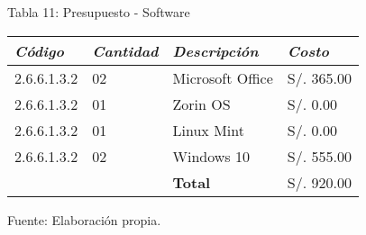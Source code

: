             \begin{table}[h!]
                \centering
                { Tabla 11: Presupuesto - Software}\par
                \begin{tabular}{|p{2.2cm}|p{1.8cm}|p{3.8cm}|p{2.2cm}|} \hline
                    
                
                \textit{{\bf{Código}}} &
                \textit{{\bf{Cantidad}}} &
                \textit{{\bf{Descripción}}} &
                \textit{{\bf{Costo}}}
                \\ \hline

                2.6.6.1.3.2 &
                02 &
                Microsoft Office &
                S/. 365.00
                \\ \hline

                2.6.6.1.3.2 &
                01 &
                Zorin OS &
                S/. 0.00
                \\ \hline

                2.6.6.1.3.2 &
                01 &
                Linux Mint &
                S/. 0.00
                \\ \hline

                2.6.6.1.3.2 &
                02 &
                Windows 10 &
                S/. 555.00
                \\ \hline

                &
                &
                \bf{Total} &
                S/. 920.00
                \\ \hline

                \end{tabular}
                \begin{center}
                    \vskip -0.2cm
                    {\small{Fuente: Elaboración propia.}}
                \end{center}
            \end{table}

